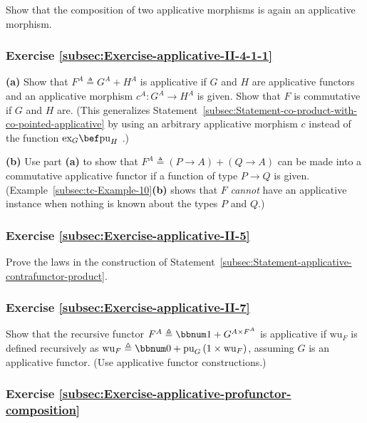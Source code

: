 Show that the composition of two applicative morphisms is again an
applicative morphism.

\subsubsection{Exercise \label{subsec:Exercise-applicative-II-4-1-1}\ref{subsec:Exercise-applicative-II-4-1-1}}

\textbf{(a)} Show that $F^{A}\triangleq G^{A}+H^{A}$ is applicative
if $G$ and $H$ are applicative functors and an applicative morphism
$c^{A}:G^{A}\rightarrow H^{A}$ is given. Show that $F$ is commutative
if $G$ and $H$ are. (This generalizes Statement~\ref{subsec:Statement-co-product-with-co-pointed-applicative}
by using an arbitrary applicative morphism $c$ instead of the function
$\text{ex}_{G}\bef\text{pu}_{H}$ .)

\textbf{(b)} Use part \textbf{(a)} to show that $F^{A}\triangleq(P\rightarrow A)+(Q\rightarrow A)$
can be made into a commutative applicative functor if a function of
type $P\rightarrow Q$ is given. (Example~\ref{subsec:tc-Example-10}\textbf{(b)}
shows that $F$ \emph{cannot} have an applicative instance when nothing
is known about the types $P$ and $Q$.)

\subsubsection{Exercise \label{subsec:Exercise-applicative-II-5}\ref{subsec:Exercise-applicative-II-5}}

Prove the laws in the construction of Statement~\ref{subsec:Statement-applicative-contrafunctor-product}.

\subsubsection{Exercise \label{subsec:Exercise-applicative-II-7}\ref{subsec:Exercise-applicative-II-7}}

Show that the recursive functor $F^{A}\triangleq\bbnum 1+G^{A\times F^{A}}$
is applicative if $\text{wu}_{F}$ is defined recursively as $\text{wu}_{F}\triangleq\bbnum 0+\text{pu}_{G}\left(1\times\text{wu}_{F}\right)$,
assuming $G$ is an applicative functor. (Use applicative functor
constructions.)

\subsubsection{Exercise \label{subsec:Exercise-applicative-profunctor-composition}\ref{subsec:Exercise-applicative-profunctor-composition}}

